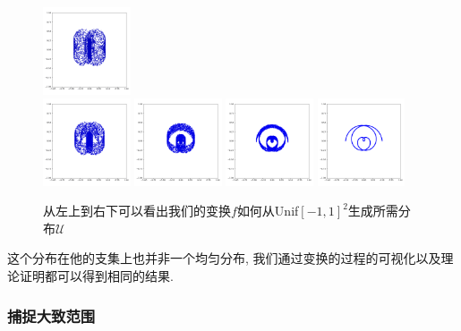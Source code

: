 \documentclass[lang=cn,11pt]{elegantpaper}
\begin{document}
\begin{figure}[hbt]
  \includegraphics[width=0.23\textwidth]{wings_1_8}\\
  \includegraphics[width=0.23\textwidth]{wings_1_9}
  \includegraphics[width=0.23\textwidth]{wings_1_10}
  \includegraphics[width=0.23\textwidth]{wings_1_11}
  \includegraphics[width=0.23\textwidth]{wings_1_12}

  
  \caption{从左上到右下可以看出我们的变换$f$如何从Unif$[-1,1]^2$生成所需分布$\mathcal U$}
\end{figure}

这个分布在他的支集上也并非一个均匀分布, 我们通过变换的过程的可视化以及理论证明都可以得到相同的结果.

\subsubsection{捕捉大致范围}
\end{document}
